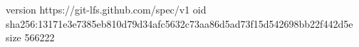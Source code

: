 version https://git-lfs.github.com/spec/v1
oid sha256:13171e3e7385eb810d79d34afc5632c73aa86d5ad73f15d542698bb22f442d5e
size 566222
